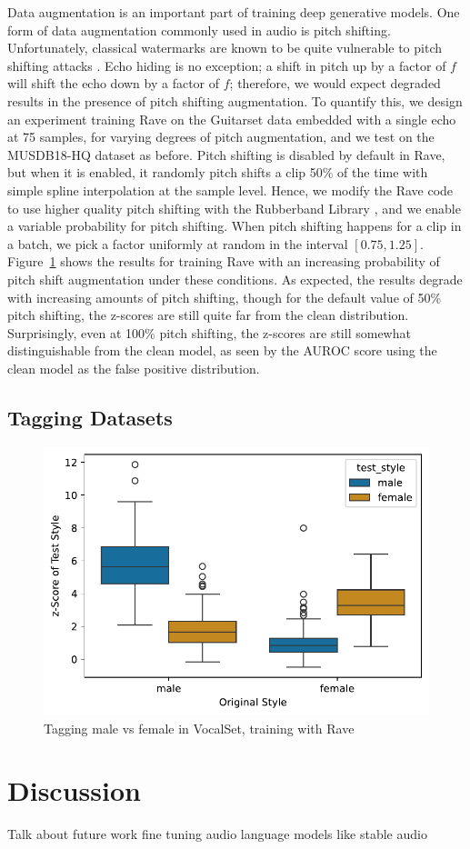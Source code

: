 \documentclass[letterpaper]{article} %
\begin{document}
Data augmentation is an important part of training deep generative models.  One form of data augmentation commonly used in audio is pitch shifting.  Unfortunately, classical watermarks are known to be quite vulnerable to pitch shifting attacks \cite{hu2014variable}.  Echo hiding is no exception; a shift in pitch up by a factor of $f$ will shift the echo down by a factor of $f$; therefore, we would expect degraded results in the presence of pitch shifting augmentation.  To quantify this, we design an experiment training Rave on the Guitarset data embedded with a single echo at 75 samples, for varying degrees of pitch augmentation, and we test on the MUSDB18-HQ dataset as before.  Pitch shifting is disabled by default in Rave, but when it is enabled, it randomly pitch shifts a clip 50\% of the time with simple spline interpolation at the sample level.  Hence, we modify the Rave code to use higher quality pitch shifting with the Rubberband Library \cite{cannam2024pyrubberband}, and we enable a variable probability for pitch shifting.  When pitch shifting happens for a clip in a batch, we pick a factor uniformly at random in the interval $[0.75, 1.25]$.  Figure~\ref{fig:pitchshiftaugmentation} shows the results for training Rave with an increasing probability of pitch shift augmentation under these conditions.  As expected, the results degrade with increasing amounts of pitch shifting, though for the default value of 50\% pitch shifting, the z-scores are still quite far from the clean distribution.  Surprisingly, even at 100\% pitch shifting, the z-scores are still somewhat distinguishable from the clean model, as seen by the AUROC score using the clean model as the false positive distribution.

\subsection{Tagging Datasets}

\begin{figure}
    \centering
    \includegraphics[width=\columnwidth]{figs/Rave_Tagging_MaleFemale.pdf}
    \caption{Tagging male vs female in VocalSet, training with Rave}
    \label{fig:pitchshiftaugmentation}
\end{figure}




\section{Discussion}
Talk about future work fine tuning audio language models like stable audio



\end{document}
